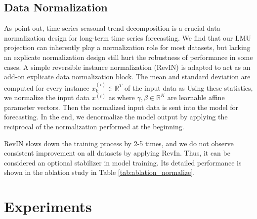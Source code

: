 \documentclass{article}
\begin{document}
\subsection{Data Normalization}\vspace{-1mm}
As \cite{Autoformer,FedFormer} point out, time series seasonal-trend decomposition is a crucial data normalization design for long-term time series forecasting. We find that our LMU projection can inherently play a normalization role for most datasets, but lacking an explicate normalization design still hurt the robustness of performance in some cases. A simple reversible instance normalization (RevIN) \cite{reversible} is adapted to act as an add-on explicate data normalization block. 
The mean and standard deviation are computed for every instance $x_{k}^{(i)} \in \mathbb{R}^{T}$ of the input data as
Using these statistics, we normalize the input data $x^{(i)}$  as
where $\gamma, \beta \in \mathbb{R}^{K}$ are learnable affine parameter vectors. 
Then the normalized input data is sent into the model for forecasting. In the end, we denormalize the model output by applying the reciprocal of the normalization performed at the beginning. 

RevIN slows down the training process by 2-5 times, and we do not observe consistent improvement on all datasets by applying RevIn. Thus, it can be considered an optional stabilizer in model training. Its detailed performance is shown in the ablation study in Table \ref{tab:ablation_normalize}.




 \section{Experiments}\label{sec_exp}\vspace{-2mm}
\end{document}
